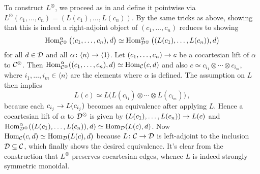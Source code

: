 \begin{proof*}
	To construct $L^\otimes$, we proceed as in  and define it pointwise via $L^\otimes(c_1,\dotsc,c_n)=(L(c_1),\dotsc,L(c_n))$. By the same tricks as above, showing that this is indeed a right-adjoint object of $(c_1,\dotsc,c_n)$ reduces to showing
	\begin{equation*}
		\operatorname{Hom}_{\mathcal{C}^\otimes}^\alpha\big((c_1,\dotsc,c_n),d\big)\simeq \operatorname{Hom}_{\mathcal{D}^\otimes}^\alpha\big((L(c_1),\dotsc,L(c_n)),d\big)
	\end{equation*}
	for all $d\in \mathcal{D}$ and all $\alpha\colon \langle n\rangle \morphism\langle 1\rangle$. Let $(c_1,\dotsc,c_n)\morphism c$ be a cocartesian lift of $\alpha$ to $\mathcal{C}^\otimes$. Then $\operatorname{Hom}_{\mathcal{C}^\otimes}^\alpha((c_1,\dotsc,c_n),d)\simeq\operatorname{Hom}_{\mathcal{C}}(c,d)$ and also $c\simeq c_{i_1}\otimes\dotsb\otimes c_{i_m}$, where $i_1,\dotsc,i_m\in\langle n\rangle$ are the elements where $\alpha$ is defined. The assumption on $L$ then implies
	\begin{equation*}
		L(c)\simeq L\big(L(c_{i_1})\otimes\dotsb\otimes L(c_{i_m})\big)\,,
	\end{equation*}
	because each $c_{i_j}\morphism L(c_{i_j})$ becomes an equivalence after applying $L$. Hence a cocartesian lift of $\alpha$ to $\mathcal{D}^\otimes$ is given by $(L(c_1),\dotsc,L(c_n))\morphism L(c)$ and $\operatorname{Hom}_{\mathcal{D}^\otimes}^\alpha((L(c_1),\dotsc,L(c_n)),d)\simeq \operatorname{Hom}_{\mathcal{D}}(L(c),d)$. Now $\operatorname{Hom}_{\mathcal{C}}(c,d)\simeq \operatorname{Hom}_{\mathcal{D}}(L(c),d)$ because $L\colon \Cc\morphism\Dd$ is left-adjoint to the inclusion $\mathcal{D}\subseteq\mathcal{C}$, which finally shows the desired equivalence. It's clear from the construction that $L^\otimes$ preserves cocartesian edges, whence $L$ is indeed strongly symmetric monoidal.
\end{proof*}

